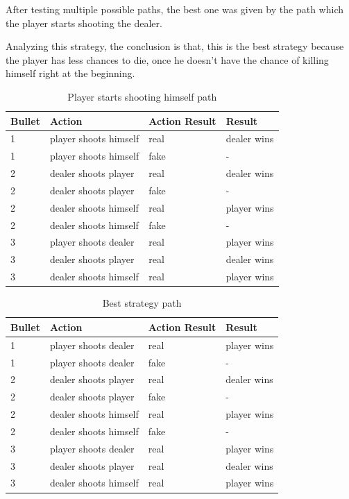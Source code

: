 \documentclass[sn-mathphys-num]{sn-jnl}
\begin{document}
After testing multiple possible paths, the best one was given by the path which the player starts shooting the dealer.

Analyzing this strategy, the conclusion is that, this is the best strategy because the player has less chances to die, once he doesn't have the chance of killing himself right at the beginning.

\begin{table}[ht]
	\caption{Player starts shooting himself path}\label{playerStartsShootsHimselfPath}%
	\begin{tabular}{@{}llll@{}}
		\toprule
		Bullet & Action & Action Result & Result \\
		\midrule
			1 & player shoots himself  & real & dealer wins\\
			1 & player shoots himself  & fake & -\\
			2 & dealer shoots player  & real & dealer wins\\
			2 & dealer shoots player  & fake & -\\
			2 & dealer shoots himself  & real & player wins\\
			2 & dealer shoots himself  & fake & -\\
			3 & player shoots dealer  & real & player wins\\
			3 & dealer shoots player & real & dealer wins\\
			3 & dealer shoots himself & real & player wins\\
	\end{tabular}
\end{table}

\begin{table}[ht]
	\caption{Best strategy path}\label{bestStrategyPath}%
	\begin{tabular}{@{}llll@{}}
		\toprule
		Bullet & Action & Action Result & Result \\
		\midrule
			1 & player shoots dealer  & real & player wins\\
			1 & player shoots dealer  & fake & -\\
			2 & dealer shoots player  & real & dealer wins\\
			2 & dealer shoots player  & fake & -\\
			2 & dealer shoots himself  & real & player wins\\
			2 & dealer shoots himself  & fake & -\\
			3 & player shoots dealer  & real & player wins\\
			3 & dealer shoots player & real & dealer wins\\
			3 & dealer shoots himself & real & player wins\\
	\end{tabular}
\end{table}
\end{document}
